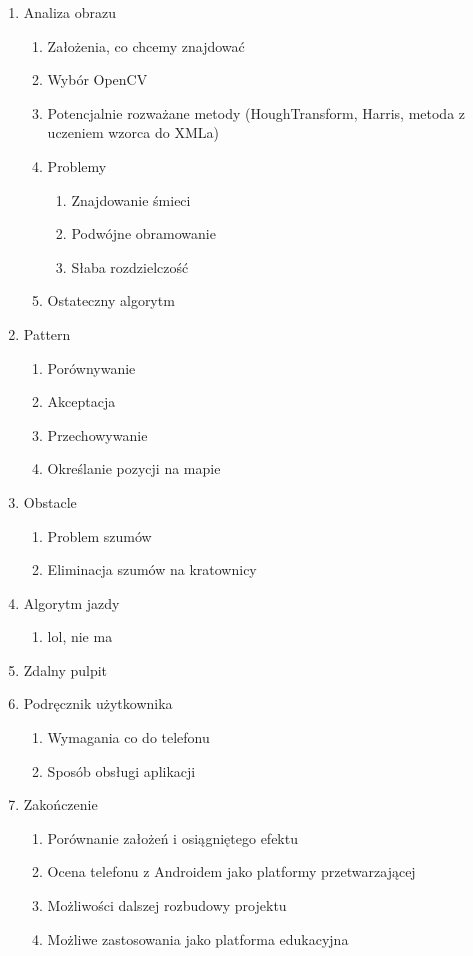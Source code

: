 \begin{enumerate}
	\item{Analiza obrazu}
	\begin{enumerate}
		\item{Założenia, co chcemy znajdować}
		\item{Wybór OpenCV}
		\item{Potencjalnie rozważane metody (HoughTransform, Harris, metoda z uczeniem wzorca do XMLa)}
		\item{Problemy}
		\begin{enumerate}
			\item{Znajdowanie śmieci}
			\item{Podwójne obramowanie}
			\item{Słaba rozdzielczość}
		\end{enumerate}
		\item{Ostateczny algorytm}
	\end{enumerate}
	
	\item{Pattern}
	\begin{enumerate}
		\item{Porównywanie}
		\item{Akceptacja}
		\item{Przechowywanie}
		\item{Określanie pozycji na mapie}
	\end{enumerate}
	
	\item{Obstacle}
	\begin{enumerate}
		\item{Problem szumów}
		\item{Eliminacja szumów na kratownicy}
	\end{enumerate}

	\item{Algorytm jazdy}
	\begin{enumerate}
		\item{lol, nie ma}
	\end{enumerate}
	
	\item{Zdalny pulpit}
	
	\item{Podręcznik użytkownika}
	\begin{enumerate}
		\item{Wymagania co do telefonu}
		\item{Sposób obsługi aplikacji}
	\end{enumerate}
	
	\item{Zakończenie}
	\begin{enumerate}
		\item{Porównanie założeń i osiągniętego efektu}
		\item{Ocena telefonu z Androidem jako platformy przetwarzającej}
		\item{Możliwości dalszej rozbudowy projektu}
		\item{Możliwe zastosowania jako platforma edukacyjna}
	\end{enumerate}

\end{enumerate}
	